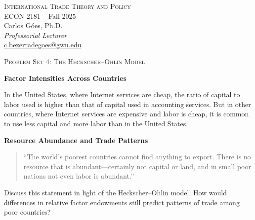 \documentclass[11pt,letterpaper]{exam}
\begin{document}
\begin{center}
\Large{\textsc{International Trade Theory and Policy}}\\[4pt]
\Large{ECON 2181 \;--\; Fall 2025}\\[6pt]
\large Carlos Góes, Ph.D. \\
\textit{Professorial Lecturer}\\
\href{mailto:c.bezerradegoes@gwu.edu}{c.bezerradegoes@gwu.edu} \\
\end{center}

\bigskip

\begin{center}
\Large{\textsc{Problem Set 4: The Heckscher–Ohlin Model}}
\end{center}

\begin{questions}

\question \textbf{Factor Intensities Across Countries}

In the United States, where Internet services are cheap, the ratio of capital to labor used is higher than that of capital used in accounting services. But in other countries, where Internet services are expensive and labor is cheap, it is common to use less capital and more labor than in the United States. 


\question \textbf{Resource Abundance and Trade Patterns}

\begin{quote}
``The world’s poorest countries cannot find anything to export. There is no resource that is abundant—certainly not capital or land, and in small poor nations not even labor is abundant.’’
\end{quote}

Discuss this statement in light of the Heckscher–Ohlin model. How would differences in relative factor endowments still predict patterns of trade among poor countries?


\end{questions}
\end{document}
